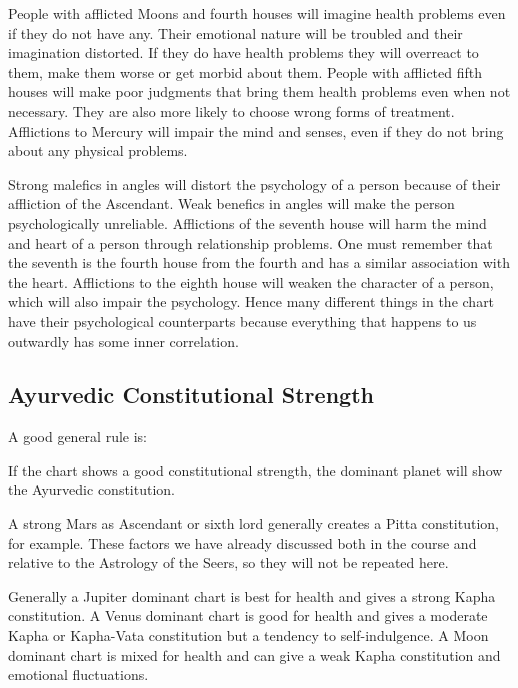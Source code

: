  

People with afflicted Moons and fourth houses will imagine health problems even if they do not have any. Their emotional nature will be troubled and their imagination distorted. If they do have health problems they will overreact to them, make them worse or get morbid about them. People with afflicted fifth houses will make poor judgments that bring them health problems even when not necessary. They are also more likely to choose wrong forms of treatment. Afflictions to Mercury will impair the mind and senses, even if they do not bring about any physical problems.

 

Strong malefics in angles will distort the psychology of a person because of their affliction of the Ascendant. Weak benefics in angles will make the person psychologically unreliable. Afflictions of the seventh house will harm the mind and heart of a person through relationship problems. One must remember that the seventh is the fourth house from the fourth and has a similar association with the heart. Afflictions to the eighth house will weaken the character of a person, which will also impair the psychology. Hence many different things in the chart have their psychological counterparts because everything that happens to us outwardly has some inner correlation.

 

\subsection{Ayurvedic Constitutional Strength}
 

A good general rule is:

If the chart shows a good constitutional strength, the dominant planet will show the Ayurvedic constitution.
 

A strong Mars as Ascendant or sixth lord generally creates a Pitta constitution, for example. These factors we have already discussed both in the course and relative to the Astrology of the Seers, so they will not be repeated here.

 

Generally a Jupiter dominant chart is best for health and gives a strong Kapha constitution. A Venus dominant chart is good for health and gives a moderate Kapha or Kapha-Vata constitution but a tendency to self-indulgence. A Moon dominant chart is mixed for health and can give a weak Kapha constitution and emotional fluctuations.

